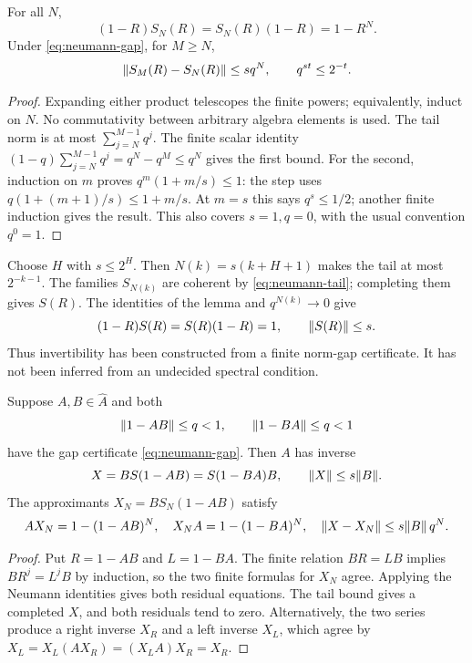 \begin{lemma}\label{lem:neumann-finite}
For all $N$,
\[
 (1-R)S_N(R)=S_N(R)(1-R)=1-R^N.
\]
Under \eqref{eq:neumann-gap}, for $M\ge N$,
\begin{equation}\label{eq:neumann-tail}
 \lVert S_M(R)-S_N(R)\rVert\le s q^N,
 \qquad q^{st}\le2^{-t}.
\end{equation}
\end{lemma}
\begin{proof}
Expanding either product telescopes the finite powers; equivalently, induct on $N$. No commutativity between arbitrary algebra elements is used. The tail norm is at most $\sum_{j=N}^{M-1}q^j$. The finite scalar identity
$(1-q)\sum_{j=N}^{M-1}q^j=q^N-q^M\le q^N$
gives the first bound. For the second, induction on $m$ proves $q^m(1+m/s)\le1$: the step uses
$q(1+(m+1)/s)\le1+m/s$.
At $m=s$ this says $q^s\le1/2$; another finite induction gives the result. This also covers $s=1,q=0$, with the usual convention $q^0=1$.
\end{proof}

Choose $H$ with $s\le2^H$. Then $N(k)=s(k+H+1)$ makes the tail at most $2^{-k-1}$. The families $S_{N(k)}$ are coherent by \eqref{eq:neumann-tail}; completing them gives $S(R)$. The identities of the lemma and $q^{N(k)}\to0$ give
\[
 (1-R)S(R)=S(R)(1-R)=1,\qquad \lVert S(R)\rVert\le s.
\]
Thus invertibility has been constructed from a finite norm-gap certificate. It has not been inferred from an undecided spectral condition.

\begin{proposition}\label{prop:two-sided}
Suppose $A,B\in\widehat A$ and both
\[
 \lVert 1-AB\rVert\le q<1,\qquad \lVert 1-BA\rVert\le q<1
\]
have the gap certificate \eqref{eq:neumann-gap}. Then $A$ has inverse
\[
 X=B S(1-AB)=S(1-BA)B,
 \qquad \lVert X\rVert\le s\lVert B\rVert.
\]
The approximants $X_N=B S_N(1-AB)$ satisfy
\[
 AX_N=1-(1-AB)^N,\quad X_NA=1-(1-BA)^N,
 \quad\lVert X-X_N\rVert\le s\lVert B\rVert\,q^N.
\]
\end{proposition}
\begin{proof}
Put $R=1-AB$ and $L=1-BA$. The finite relation $BR=LB$ implies $BR^j=L^jB$ by induction, so the two finite formulas for $X_N$ agree. Applying the Neumann identities gives both residual equations. The tail bound gives a completed $X$, and both residuals tend to zero. Alternatively, the two series produce a right inverse $X_R$ and a left inverse $X_L$, which agree by $X_L=X_L(AX_R)=(X_LA)X_R=X_R$.
\end{proof}

